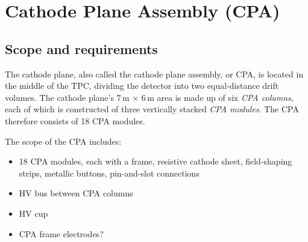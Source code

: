 


\section{Cathode Plane Assembly (CPA)}
\label{sec:cpa}

\subsection{Scope and requirements}


The cathode plane, also called the cathode plane assembly, or CPA, is located in the middle of the TPC, dividing the detector into two equal-distance drift volumes. The cathode plane's 7\,m $\times$ 6\,m area is made up of six \textit{CPA columns}, each of which is constructed of three vertically stacked \textit{CPA modules}. The CPA therefore consists of 18 CPA modules. 

The scope of the CPA includes:

\begin{itemize}
\item 18 CPA modules, each with a frame, resistive cathode sheet, field-shaping strips, metallic buttons, pin-and-slot connections
\item HV bus between CPA columns
\item HV cup
\item CPA frame electrodes?
\end{itemize}


